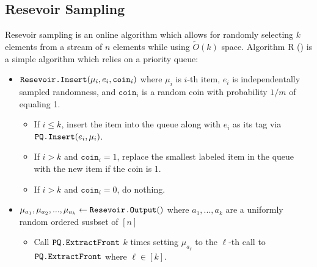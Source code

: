 \subsection{Resevoir Sampling}
Resevoir sampling is an online algorithm which allows for randomly selecting
$k$ elements from a stream of $n$ elements while using $\tilde{O}(k)$ space.
Algorithm R (\cite{vitter1985random}) is a simple algorithm which relies on a priority queue:
\begin{itemize}
	\item $\texttt{Resevoir.Insert}(\mu_i, e_i, \texttt{coin}_i)$ where $\mu_i$ is $i$-th item, $e_i$ is independentally sampled randomness,
	and $\texttt{coin}_i$ is a random coin with probability $1/m$ of equaling 1.
	      \begin{itemize}
		      \item If $i \leq k$, insert the item into the queue along with $e_i$ as its tag via $\texttt{PQ.Insert}(e_i, \mu_i)$.
		      \item If $i > k$ and $\texttt{coin}_i = 1$, replace the smallest labeled item in the queue with the new item if the coin is 1.
					\item If $i > k$ and $\texttt{coin}_i = 0$, do nothing.
	      \end{itemize}

	\item  $\mu_{a_1}, \mu_{a_2}, ..., \mu_{a_k} \gets \texttt{Resevoir.Output}()$ where $a_1, ..., a_k$ are a uniformly random ordered susbset of $[n]$
	\begin{itemize}
		\item Call $\texttt{PQ.ExtractFront}$ $k$ times setting $\mu_{a_\ell}$ to the $\ell$-th call to $\texttt{PQ.ExtractFront}$ where $\ell \in [k]$.
	\end{itemize}
\end{itemize}

